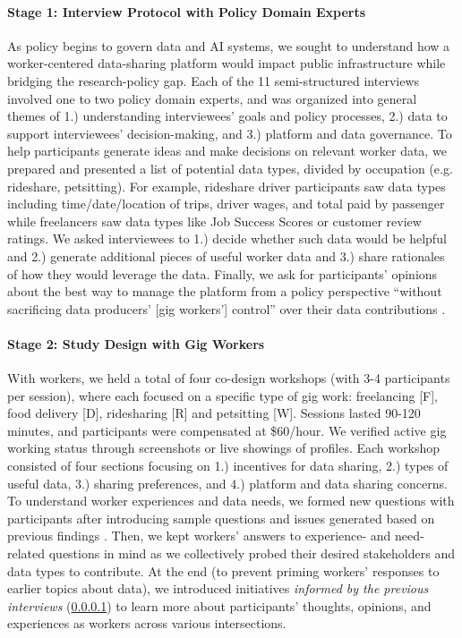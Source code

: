 \paragraph{Stage 1: Interview Protocol with Policy Domain Experts}\label{interviews}
As policy begins to govern data and AI systems, we sought to understand how a worker-centered data-sharing platform would impact public infrastructure while bridging the research-policy gap. Each of the 11 semi-structured interviews involved one to two policy domain experts, and was organized into general themes of 1.) understanding interviewees' goals and policy processes, 2.) data to support interviewees' decision-making, and 3.) platform and data governance. To help participants generate ideas and make decisions on relevant worker data, we prepared and presented a list of potential data types, divided by occupation (e.g. rideshare, petsitting). {For example, rideshare driver participants saw data types including time/date/location of trips, driver wages, and total paid by passenger while freelancers saw data types like Job Success Scores or customer review ratings.} {We asked interviewees} to 1.) decide whether such data would be helpful and 2.) generate additional pieces of useful worker data and 3.) share rationales of how they would leverage the data. Finally, we ask for participants' opinions about the best way to manage the platform from a policy perspective ``without sacrificing data producers' [gig workers'] control'' over their data contributions \cite{GUVs}. 

\paragraph{Stage 2: Study Design with Gig Workers}\label{h.5r3oji4mg7tb}
With workers, we held a total of four co-design workshops (with 3-4 participants per session), where each focused on a specific type of gig work: freelancing [F], food delivery [D], ridesharing [R] and petsitting [W]. 
Sessions lasted 90-120 minutes, and participants were compensated at \$60/hour{. We} verified active gig working status through screenshots or live showings of {profiles}. 
Each workshop consisted of four sections focusing on 1.) incentives for data sharing, 2.) types of {useful data}, 3.) sharing preferences, and 4.) platform and data sharing concerns. 
To understand worker experiences and data needs, we formed new questions with participants {after introducing sample questions and issues generated based on previous findings \cite{xAXX,4Qr5,TdXv}}. 
Then, we kept workers' answers to experience- and need-related questions in mind as we collectively probed {their desired stakeholders and data types to contribute}. 
At the end (to prevent priming workers' responses to earlier topics about data), we introduced initiatives \emph{informed by the previous interviews} (\ref{interviews}) to learn more about {participants'} thoughts, opinions, and experiences as workers across various intersections. 

